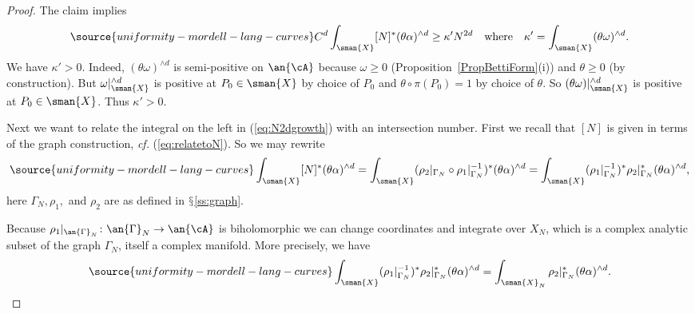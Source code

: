 \begin{proof}
The claim implies
\begin{equation}
\label{eq:N2dgrowth}
\source{uniformity-mordell-lang-curves}
 C^d \int_{\sman{X}}  [N]^*(\theta\alpha)^{\wedge d} \ge
\kappa' N^{2d} \quad\text{where}\quad \kappa' = \int_{\sman{X}} (\theta\omega)^{\wedge d}.
\end{equation}
We have $\kappa' > 0$. Indeed, $(\theta\omega)^{\wedge d}$ is semi-positive on $\an{\cA}$ because $\omega \ge 0$ (Proposition~\ref{PropBettiForm}(i)) and $\theta \ge 0$ (by construction). But $\omega|_{\sman{X}}^{\wedge d}$ is positive at $P_0 \in \sman{X}$ by choice of $P_0$ and $\theta\circ \pi(P_0) = 1$ by choice of $\theta$. So $(\theta\omega)|_{\sman{X}}^{\wedge d}$ is positive at $P_0 \in \sman{X}$. Thus $\kappa' > 0$.

Next we want to relate the integral on the left in (\ref{eq:N2dgrowth}) with an
intersection number. First we recall that $[N]$ is given in terms of
the graph construction, \textit{cf.} (\ref{eq:relatetoN}). So we may
rewrite
\begin{equation}
\label{eq:chainbegins}
\source{uniformity-mordell-lang-curves}
  \int_{\sman{X}} [N]^*(\theta\alpha)^{\wedge d}  =
  \int_{\sman{X}} (\rho_2|_{\Gamma_N} \circ
  \rho_1|_{\Gamma_N}^{-1})^*(\theta\alpha)^{\wedge d}=
  \int_{\sman{X}} (\rho_1|_{\Gamma_N}^{-1})^*\rho_2|_{\Gamma_N}^*(\theta\alpha)^{\wedge d},
\end{equation}
here $\Gamma_N,\rho_1,$ and $\rho_2$ are as defined in $\mathsection$\ref{ss:graph}.

Because $\rho_1|_{\an{\Gamma}_N} \colon \an{\Gamma}_N \rightarrow \an{\cA}$ is biholomorphic we
can change coordinates and integrate over $X_N$, which is a complex
analytic subset of the graph $\Gamma_N$, itself a complex manifold.
More precisely, we have
\begin{equation}
\label{eq:chain2}
\source{uniformity-mordell-lang-curves}
  \int_{\sman{X}} (\rho_1|_{\Gamma_N}^{-1})^*\rho_2|_{\Gamma_N}^*(\theta\alpha)^{\wedge d}
=\int_{\sman{X}_N}  \rho_2|_{\Gamma_N}^*(\theta\alpha)^{\wedge d}.
\end{equation}



\end{proof}
